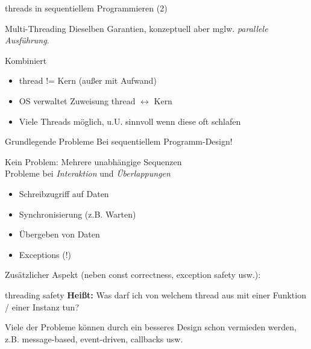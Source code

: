 \begin{frame}{threads in sequentiellem Programmieren (2)}
	\begin{block}{Multi-Threading}
		Dieselben Garantien, konzeptuell aber mglw. \emph{parallele Ausführung}.
	\end{block}
	
	\pause
	\vspace{2em}
	
	\begin{block}{Kombiniert}
		\begin{itemize}
			\item thread != Kern (außer mit Aufwand)
			\item OS verwaltet Zuweisung thread $\leftrightarrow$ Kern
			\item Viele Threads möglich, u.U. sinnvoll wenn diese oft schlafen
		\end{itemize}
	\end{block}
\end{frame}

\begin{frame}{Grundlegende Probleme}
	Bei sequentiellem Programm-Design!
	
	\vspace{1em}
	
	Kein Problem: Mehrere unabhängige Sequenzen\\
	Probleme bei \emph{Interaktion} und \emph{Überlappungen}
	\begin{itemize}
		\item Schreibzugriff auf Daten
		\item Synchronisierung (z.B. Warten)
		\item Übergeben von Daten
		\item Exceptions (!)
	\end{itemize}
	
	\vspace{1em}
	
	Zusätzlicher Aspekt (neben const correctness, exception safety usw.):
	\begin{block}{threading safety}
		\textbf{Heißt:} Was darf ich von welchem thread aus mit einer Funktion / einer Instanz tun?
	\end{block}
	
	\pause
	
	\alert{Viele der Probleme können durch ein besseres Design schon vermieden werden, z.B. message-based, event-driven, callbacks usw.}
\end{frame}


